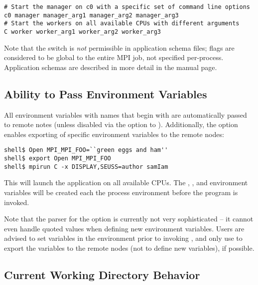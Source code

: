 \lstset{style=lam-cmdline}
\begin{lstlisting}
# Start the manager on c0 with a specific set of command line options
c0 manager manager_arg1 manager_arg2 manager_arg3
# Start the workers on all available CPUs with different arguments
C worker worker_arg1 worker_arg2 worker_arg3
\end{lstlisting}

Note that the  switch is {\em not} permissible in
application schema files;  flags are considered to be
global to the entire MPI job, not specified per-process.  Application
schemas are described in more detail in the  manual
page.


\subsection{Ability to Pass Environment Variables}

All environment variables with names that begin with
 are automatically passed to remote notes (unless
disabled via the  option to ).  Additionally,
the  option enables exporting of specific environment
variables to the remote nodes:

\lstset{style=lam-cmdline}
\begin{lstlisting}
shell$ Open MPI_MPI_FOO=``green eggs and ham''
shell$ export Open MPI_MPI_FOO
shell$ mpirun C -x DISPLAY,SEUSS=author samIam
\end{lstlisting}

This will launch the  application on all available CPUs.
The , , and 
environment variables will be created each the process environment
before the  program is invoked.

Note that the parser for the  option is currently not very
sophisticated -- it cannot even handle quoted values when defining new
environment variables.  Users are advised to set variables in the
environment prior to invoking , and only use  to
export the variables to the remote nodes (not to define new
variables), if possible.


\subsection{Current Working Directory Behavior}

